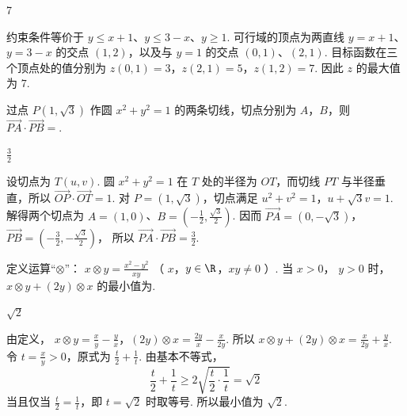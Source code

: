 \begin{answer}
7
\end{answer}

\begin{solution}
约束条件等价于 \(y\leqslant x+1\)、\(y\leqslant3-x\)、\(y\geqslant1\). 可行域的顶点为两直线 \(y=x+1\)、\(y=3-x\) 的交点 \((1,2)\)，以及与 \(y=1\) 的交点 \((0,1)\)、\((2,1)\). 目标函数在三个顶点处的值分别为
\(z(0,1)=3\)，\(z(2,1)=5\)，\(z(1,2)=7\).
因此 \(z\) 的最大值为 \(7\).
\end{solution}

\begin{problem}
过点 \(P(1, \sqrt{3})\) 作圆 \(x^2 + y^2 = 1\) 的两条切线，切点分别为 \(A\)，\(B\)，则 \(\overrightarrow{PA} \cdot \overrightarrow{PB} = \)\fillinblank{}.
\end{problem}

\begin{answer}
\(\frac{3}{2}\)
\end{answer}

\begin{solution}
设切点为 \(T(u,v)\). 圆 \(x^2+y^2=1\) 在 \(T\) 处的半径为 \(OT\)，而切线 \(PT\) 与半径垂直，所以 \(\overrightarrow{OP}\cdot\overrightarrow{OT}=1\). 对 \(P=(1,\sqrt3)\)，切点满足
\(u^2+v^2=1\)，\(u+\sqrt3v=1\).
解得两个切点为 \(A=(1,0)\)、\(B=\left(-\frac12,\frac{\sqrt3}{2}\right)\). 因而
\(\overrightarrow{PA}=(0,-\sqrt3)\)，\(\overrightarrow{PB}=\left(-\frac32,-\frac{\sqrt3}{2}\right)\)，
所以 \(\overrightarrow{PA}\cdot\overrightarrow{PB}=\frac32\).
\end{solution}

\begin{problem}
定义运算“\(\otimes\)”： \( x \otimes y = \frac{x^{2} - y^{2}}{xy} \) （ \(x\)，\(y \in \R\)，\(xy \neq 0\) ）. 当 \(x > 0\)， \(y > 0\) 时， \( x \otimes y + (2y) \otimes x \) 的最小值为\fillinblank{}.
\end{problem}

\begin{answer}
\(\sqrt{2}\)
\end{answer}

\begin{solution}
由定义，
\(x\otimes y=\frac{x}{y}-\frac{y}{x}\)，\((2y)\otimes x=\frac{2y}{x}-\frac{x}{2y}\).
所以
\(x\otimes y+(2y)\otimes x=\frac{x}{2y}+\frac{y}{x}\). 令 \(t=\frac{x}{y}>0\)，原式为 \(\frac{t}{2}+\frac1t\). 由基本不等式，
\[
\frac{t}{2}+\frac1t\geqslant2\sqrt{\frac{t}{2}\cdot\frac1t}=\sqrt2
\]
当且仅当 \(\frac{t}{2}=\frac1t\)，即 \(t=\sqrt2\) 时取等号. 所以最小值为 \(\sqrt2\).
\end{solution}

